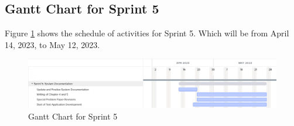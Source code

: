 \subsection{Gantt Chart for Sprint 5}
\label{subsec:gantt_chart_sprint5}
Figure \ref{fig:gantt_chart_sprint5} shows the schedule of activities for Sprint 5. 
Which will be from April 14, 2023, to May 12, 2023.
\begin{figure}[ht]
    \centering
    \includegraphics[width=1\textwidth]{./assets/Gantt_Chart_Sprint5.png}
    \caption{Gantt Chart for Sprint 5}
    \label{fig:gantt_chart_sprint5}
\end{figure}
\FloatBarrier